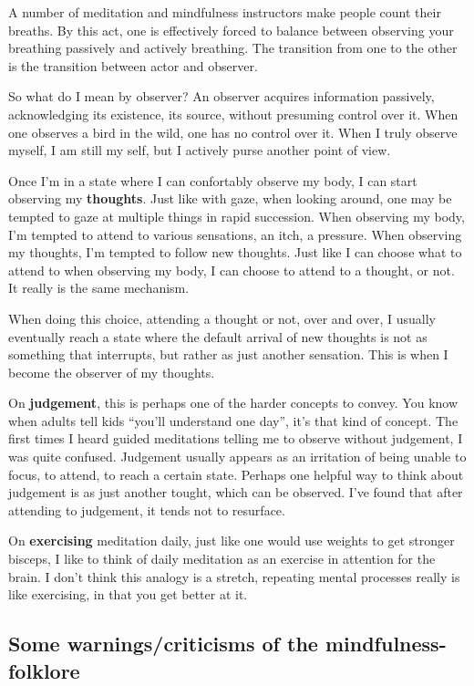 A number of meditation and mindfulness instructors make people count their breaths. By this act, one is effectively forced to balance between observing your breathing passively and actively breathing. The transition from one to the other is the transition between actor and observer. 

So what do I mean by observer? An observer acquires information passively, acknowledging its existence, its source, without presuming control over it. When one observes a bird in the wild, one has no control over it. When I truly observe myself, I am still my self, but I actively purse another point of view.

Once I'm in a state where I can confortably observe my body, I can start observing my \textbf{thoughts}. Just like with gaze, when looking around, one may be tempted to gaze at multiple things in rapid succession. When observing my body, I'm tempted to attend to various sensations, an itch, a pressure. When observing my thoughts, I'm tempted to follow new thoughts. Just like I can choose what to attend to when observing my body, I can choose to attend to a thought, or not. It really is the same mechanism.

When doing this choice, attending a thought or not, over and over, I usually eventually reach a state where the default arrival of new thoughts is not as something that interrupts, but rather as just another sensation. This is when I become the observer of my thoughts.

On \textbf{judgement}, this is perhaps one of the harder concepts to convey. You know when adults tell kids ``you'll understand one day'', it's that kind of concept. The first times I heard guided meditations telling me to observe without judgement, I was quite confused. Judgement usually appears as an irritation of being unable to focus, to attend, to reach a certain state. Perhaps one helpful way to think about judgement is as just another tought, which can be observed. I've found that after attending to judgement, it tends not to resurface. 

On \textbf{exercising} meditation daily, just like one would use weights to get stronger bisceps, I like to think of daily meditation as an exercise in attention for the brain. I don't think this analogy is a stretch, repeating mental processes really is like exercising, in that you get better at it.



\subsection{Some warnings/criticisms of the mindfulness-folklore}

